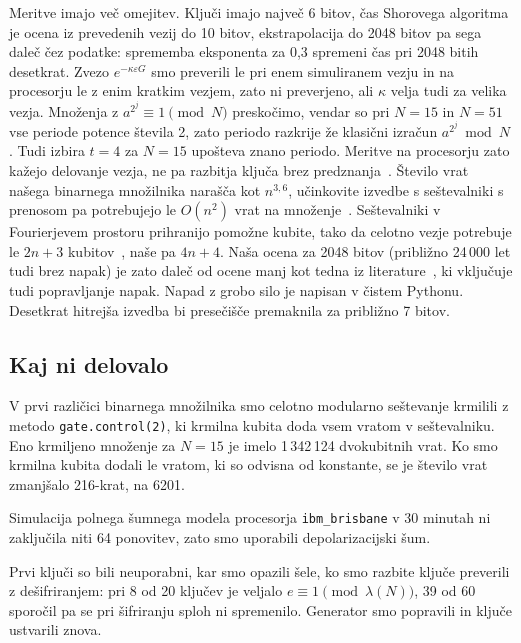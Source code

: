 Meritve imajo več omejitev. Ključi imajo največ 6 bitov, čas Shorovega algoritma je ocena iz prevedenih vezij do 10 bitov, ekstrapolacija do 2048 bitov pa sega daleč čez podatke: sprememba eksponenta za 0,3 spremeni čas pri 2048 bitih desetkrat. Zvezo $e^{-\kappa\varepsilon G}$ smo preverili le pri enem simuliranem vezju in na procesorju le z enim kratkim vezjem, zato ni preverjeno, ali $\kappa$ velja tudi za velika vezja. Množenja z $a^{2^j} \equiv 1 \pmod N$ preskočimo, vendar so pri $N = 15$ in $N = 51$ vse periode potence števila 2, zato periodo razkrije že klasični izračun $a^{2^j} \bmod N$. Tudi izbira $t = 4$ za $N = 15$ upošteva znano periodo. Meritve na procesorju zato kažejo delovanje vezja, ne pa razbitja ključa brez predznanja~\cite{g29:smolin2013}. Število vrat našega binarnega množilnika narašča kot $n^{3{,}6}$, učinkovite izvedbe s seštevalniki s prenosom pa potrebujejo le $O(n^2)$ vrat na množenje~\cite{g29:vedral1996}. Seštevalniki v Fourierjevem prostoru prihranijo pomožne kubite, tako da celotno vezje potrebuje le $2n+3$ kubitov~\cite{g29:beauregard2003}, naše pa $4n+4$. Naša ocena za 2048 bitov (približno 24\,000 let tudi brez napak) je zato daleč od ocene manj kot tedna iz literature~\cite{g29:gidney2025}, ki vključuje tudi popravljanje napak. Napad z grobo silo je napisan v čistem Pythonu. Desetkrat hitrejša izvedba bi presečišče premaknila za približno 7 bitov.

\subsection{Kaj ni delovalo}
\label{g29:sec:neuspehi}

V prvi različici binarnega množilnika smo celotno modularno seštevanje krmilili z metodo \texttt{gate.control(2)}, ki krmilna kubita doda vsem vratom v seštevalniku. Eno krmiljeno množenje za $N = 15$ je imelo 1\,342\,124 dvokubitnih vrat. Ko smo krmilna kubita dodali le vratom, ki so odvisna od konstante, se je število vrat zmanjšalo 216-krat, na 6201.

Simulacija polnega šumnega modela procesorja \texttt{ibm\_brisbane} v 30 minutah ni zaključila niti 64 ponovitev, zato smo uporabili depolarizacijski šum.

Prvi ključi so bili neuporabni, kar smo opazili šele, ko smo razbite ključe preverili z dešifriranjem: pri 8 od 20 ključev je veljalo $e \equiv 1 \pmod{\lambda(N)}$, 39 od 60 sporočil pa se pri šifriranju sploh ni spremenilo. Generator smo popravili in ključe ustvarili znova.


